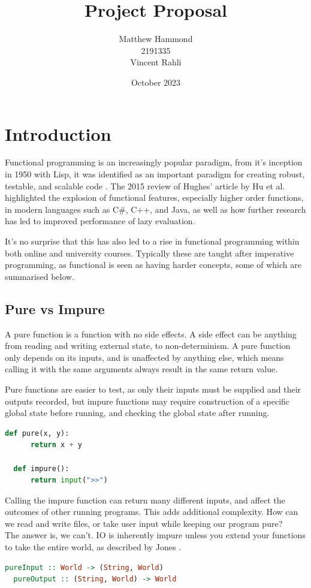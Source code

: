 \documentclass[a4paper]{article}
\title{Project Proposal}
\author{Matthew Hammond\\2191335\\Vincent Rahli}
\date{October 2023}
\begin{document}
\maketitle

\section{Introduction}
Functional programming is an increasingly popular paradigm, from it's inception in 1950 with Lisp, it was identified as an important paradigm for creating robust, testable, and scalable code \cite{10.1093/comjnl/32.2.98}. The 2015 review of Hughes' article by Hu et al. \cite{10.1093/nsr/nwv042} highlighted the explosion of functional features, especially higher order functions, in modern languages such as C\#, C++, and Java, as well as how further research has led to improved performance of lazy evaluation.

It's no surprise that this has also led to a rise in functional programming within both online and university courses. \cite{warwickFP, kentFP, birminghamFP, courseraFP} Typically these are taught after imperative programming, as functional is seen as having harder concepts, some of which are summarised below.
\subsection{Pure vs Impure}
A pure function is a function with no side effects. A side effect can be anything from reading and writing external state, to non-determinism. A pure function only depends on its inputs, and is unaffected by anything else, which means calling it with the same arguments always result in the same return value.

Pure functions are easier to test, as only their inputs must be supplied and their outputs recorded, but impure functions may require construction of a specific global state before running, and checking the global state after running.
\begin{lstlisting}[language=python, caption=A pure and impure function.]
  def pure(x, y):
      return x + y

  def impure():
      return input(">>")
\end{lstlisting}
Calling the impure function can return many different inputs, and affect the outcomes of other running programs.
This adds additional complexity. How can we read and write files, or take user input while keeping our program pure?\\
The answer is, we can't. IO is inherently impure unless you extend your functions to take the entire world, as described by Jones \cite{peytonjones2001tackling}.
\begin{lstlisting}[language=haskell]
  pureInput :: World -> (String, World)
  pureOutput :: (String, World) -> World
\end{lstlisting}
\end{document}
